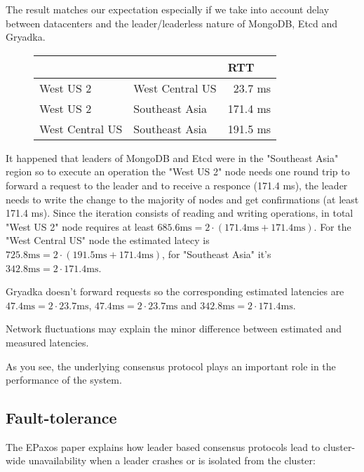\documentclass[12pt]{article}
\theoremstyle{definition}
\begin{document}
The result matches our expectation especially if we take into account delay between datacenters and the leader/leaderless nature of MongoDB, Etcd and Gryadka.

\begin{figure}[!h]
  \centering
  \begin{tabular}{llr|}
  \cline{3-3}
  & & \multicolumn{1}{|l|}{RTT} \\
  \hline
  \multicolumn{1}{|l|}{West US 2} & \multicolumn{1}{|l|}{West Central US} & 23.7 ms\\
  \hline
  \multicolumn{1}{|l|}{West US 2} & \multicolumn{1}{|l|}{Southeast Asia} & 171.4 ms\\
  \hline
  \multicolumn{1}{|l|}{West Central US} & \multicolumn{1}{|l|}{Southeast Asia} & 191.5 ms\\
  \hline
  \end{tabular}
\end{figure}

It happened that leaders of MongoDB and Etcd were in the "Southeast Asia" region so to execute an operation the "West US 2" node needs one round trip to forward a request to the leader and to receive a responce (171.4 ms), the leader needs to write the change to the majority of nodes and get confirmations (at least 171.4 ms). Since the iteration consists of reading and writing operations, in total "West US 2" node requires at least $685.6 \mbox{ms} = 2 \cdot (171.4 \mbox{ms} + 171.4 \mbox{ms})$. For the "West Central US" node the estimated latecy is $725.8 \mbox{ms} = 2 \cdot (191.5 \mbox{ms} + 171.4 \mbox{ms})$, for "Southeast Asia" it's $342.8 \mbox{ms} = 2 \cdot 171.4 \mbox{ms}$.

Gryadka doesn't forward requests so the corresponding estimated latencies are $47.4 \mbox{ms} = 2 \cdot 23.7 \mbox{ms}$, $47.4 \mbox{ms} = 2 \cdot 23.7 \mbox{ms}$ and $342.8 \mbox{ms} = 2 \cdot 171.4 \mbox{ms}$.

Network fluctuations may explain the minor difference between estimated and measured latencies.

As you see, the underlying consensus protocol plays an important role in the performance of the system.

\subsection{Fault-tolerance}

The EPaxos paper explains how leader based consensus protocols lead to cluster-wide unavailability when a leader crashes or is isolated from the cluster:
\end{document}
